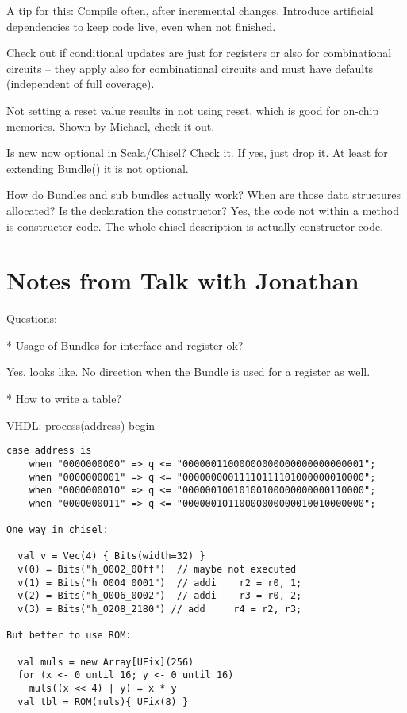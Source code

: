 \documentclass[a4paper, conference]{IEEEtran}
\begin{document}
A tip for this: Compile often, after incremental changes. Introduce artificial
dependencies to keep code live, even when not finished.

Check out if conditional updates are just for registers or also for combinational circuits
-- they apply also for combinational circuits and must have defaults (independent of
full coverage).

Not setting a reset value results in not using reset, which is good for on-chip memories. Shown by Michael, check it out.

Is new now optional in Scala/Chisel? Check it. If yes, just drop it. At least for extending Bundle()
it is not optional.

How do Bundles and sub bundles actually work? When are those data structures allocated?
Is the declaration the constructor? Yes, the code not within a method is constructor code.
The whole chisel description is actually constructor code.

\section{Notes from Talk with Jonathan}

Questions:

* Usage of Bundles for interface and register ok?

Yes, looks like. No direction when the Bundle is used for a register as well.

* How to write a table?

VHDL:
process(address) begin

\begin{verbatim}
case address is
    when "0000000000" => q <= "00000011000000000000000000000001";
    when "0000000001" => q <= "00000000011110111101000000010000";
    when "0000000010" => q <= "00000010010100100000000000110000";
    when "0000000011" => q <= "00000010110000000000010010000000";

One way in chisel:

  val v = Vec(4) { Bits(width=32) }
  v(0) = Bits("h_0002_00ff")  // maybe not executed
  v(1) = Bits("h_0004_0001")  // addi    r2 = r0, 1;
  v(2) = Bits("h_0006_0002")  // addi    r3 = r0, 2;
  v(3) = Bits("h_0208_2180") // add     r4 = r2, r3;

But better to use ROM:

  val muls = new Array[UFix](256)
  for (x <- 0 until 16; y <- 0 until 16)
    muls((x << 4) | y) = x * y
  val tbl = ROM(muls){ UFix(8) }

\end{verbatim}
\end{document}
